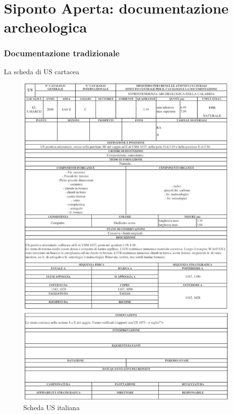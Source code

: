 \documentclass{beamer}
\begin{document}
\part{Siponto Aperta: documentazione archeologica}
\frame{\partpage}

	\section{Documentazione tradizionale}

		\begin{frame}{La scheda di US cartacea}
			\begin{multicols}{2}[][]
				\begin{figure}[]
					\begin{center}
						\includegraphics[width=0.9\linewidth]{us}
					\end{center}
					\caption{Scheda US italiana}
					\label{fig:us}
				\end{figure}

\end{multicols}
\end{frame}
\end{document}
